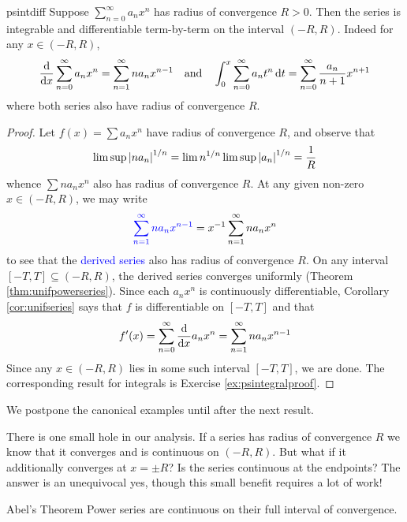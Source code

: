 \vfil

\begin{thm}{}{psintdiff}
Suppose $\sum\limits_{n=0}^\infty a_nx^n$ has radius of convergence $R>0$. Then the series is integrable and differentiable term-by-term on the interval $(-R,R)$. Indeed for any $x\in(-R,R)$,
\[\frac{\mathrm{d} }{\mathrm{d} x}\sum\limits_{n=0}^\infty a_nx^n=\sum\limits_{n=1}^\infty na_nx^{n-1}\quad\text{and}\quad\int_0^x\sum\limits_{n=0}^\infty a_nt^n\,{\mathrm{d} t}=\sum\limits_{n=0}^\infty \frac{a_n}{n+1}x^{n+1}\]
where both series also have radius of convergence $R$.
\end{thm}\goodbreak

\begin{proof}
Let $f(x)=\sum a_nx^n$ have radius of convergence $R$, and observe that
\[\limsup\left| na_n\right|^{1/n}=\lim n^{1/n}\limsup\left| a_n\right|^{1/n}=\frac 1R\]
whence $\sum na_nx^n$ also has radius of convergence $R$. At any given non-zero $x\in(-R,R)$, we may write
\[\textcolor{blue}{\sum\limits_{n=1}^\infty na_nx^{n-1}}=x^{-1}\sum\limits_{n=1}^\infty na_nx^{n}\]
to see that the \textcolor{blue}{derived series} also has radius of convergence $R$. On any interval $[-T,T]\subseteq (-R,R)$, the derived series converges uniformly (Theorem \ref{thm:unifpowerseries}). Since each $a_nx^n$ is continuously differentiable, Corollary \ref{cor:unifseries} says that $f$ is differentiable on $[-T,T]$ and that
\[f'(x)=\sum\limits_{n=0}^\infty\frac{\mathrm{d} }{\mathrm{d} x}a_nx^n= \sum\limits_{n=1}^\infty na_nx^{n-1}\]
Since any $x\in(-R,R)$ lies in some such interval $[-T,T]$, we are done.\medbreak
The corresponding result for integrals is Exercise \ref{ex:psintegralproof}.
\end{proof}

We postpone the canonical examples until after the next result.



There is one small hole in our analysis. If a series has radius of convergence $R$ we know that it converges and is continuous on $(-R,R)$. But what if it additionally converges at $x=\pm R$? Is the series continuous at the endpoints? The answer is an unequivocal yes, though this small benefit requires a lot of work!

\begin{thm}{Abel's Theorem}{}
Power series are continuous on their full interval of convergence.
\end{thm}



\def\exexabel{1}

